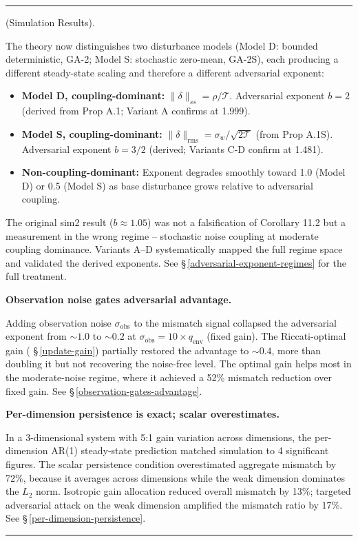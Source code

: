 \documentclass[11pt,oneside]{article}
\newcounter{claim}[section]
\renewcommand{\theclaim}{\thesection.\arabic{claim}}
\newenvironment{segment}[2]{%
  \refstepcounter{claim}%
  \bigskip\noindent\hrule\smallskip
  \noindent{\bfseries #1~\theclaim}\enskip(#2).\par\smallskip
  \noindent\ignorespaces
}{%
  \par\smallskip\noindent\hrule\bigskip
}
\newenvironment{detail}[1][]{\begin{segment}{Detail}{#1}}{\end{segment}}
\begin{document}
\begin{detail}[Simulation Results]
The theory now distinguishes two disturbance models (Model D: bounded deterministic, GA-2; Model S: stochastic zero-mean, GA-2S), each producing a different steady-state scaling and therefore a different adversarial exponent:

\begin{itemize}
  \item \textbf{Model D, coupling-dominant:} $\lVert\delta\rVert_{ss} = \rho / \mathcal{T}$. Adversarial exponent $b = 2$ (derived from Prop A.1; Variant A confirms at 1.999).
  \item \textbf{Model S, coupling-dominant:} $\lVert\delta\rVert_{\text{rms}} = \sigma_w / \sqrt{2\mathcal{T}}$ (from Prop A.1S). Adversarial exponent $b = 3/2$ (derived; Variants C-D confirm at 1.481).
  \item \textbf{Non-coupling-dominant:} Exponent degrades smoothly toward 1.0 (Model D) or 0.5 (Model S) as base disturbance grows relative to adversarial coupling.
\end{itemize}


The original sim2 result ($b \approx 1.05$) was not a falsification of Corollary 11.2 but a measurement in the wrong regime -- stochastic noise coupling at moderate coupling dominance. Variants A--D systematically mapped the full regime space and validated the derived exponents. See \S\,\ref{adversarial-exponent-regimes} for the full treatment.


\medskip\noindent\textbf{Observation noise gates adversarial advantage.}


Adding observation noise $\sigma_\text{obs}$ to the mismatch signal collapsed the adversarial exponent from $\sim 1.0$ to $\sim 0.2$ at $\sigma_\text{obs} = 10 \times q_\text{env}$ (fixed gain). The Riccati-optimal gain ( \S\,\ref{update-gain}) partially restored the advantage to $\sim 0.4$, more than doubling it but not recovering the noise-free level. The optimal gain helps most in the moderate-noise regime, where it achieved a 52\% mismatch reduction over fixed gain. See \S\,\ref{observation-gates-advantage}.


\medskip\noindent\textbf{Per-dimension persistence is exact; scalar overestimates.}


In a 3-dimensional system with 5:1 gain variation across dimensions, the per-dimension AR(1) steady-state prediction matched simulation to 4 significant figures. The scalar persistence condition overestimated aggregate mismatch by 72\%, because it averages across dimensions while the weak dimension dominates the $L_2$ norm. Isotropic gain allocation reduced overall mismatch by 13\%; targeted adversarial attack on the weak dimension amplified the mismatch ratio by 17\%. See \S\,\ref{per-dimension-persistence}.



\end{detail}
\end{document}
